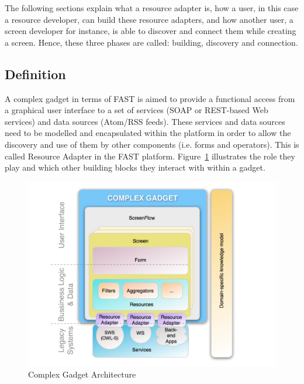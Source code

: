 \documentclass{fast_latex}
\begin{document}
The following sections explain what a resource adapter is, how a user, in this case a resource developer, can build these resource adapters, and how another user, a screen developer for instance, is able to discover and connect them while creating a screen. Hence, these three phases are called: building, discovery and connection.

\subsection{Definition} %
\label{sub:definition}

A complex gadget in terms of FAST is aimed to provide a functional access from a graphical user interface to a set of services (SOAP or REST-based Web services) and data sources (Atom/RSS feeds). These services and data sources need to be modelled and encapsulated within the platform in order to allow the discovery and use of them by other components (i.e. forms and operators). This is called Resource Adapter in the FAST platform. Figure~\ref{fig:complex_gadget_architecture} illustrates the role they play and which other building blocks they interact with within a gadget.

\begin{figure}[!htb]
  \begin{center}
    \includegraphics[width=\linewidth]{images/ComplexGadgetArchitecture.pdf}
    \caption{Complex Gadget Architecture}
    \label{fig:complex_gadget_architecture}
  \end{center}
\end{figure}
\end{document}
